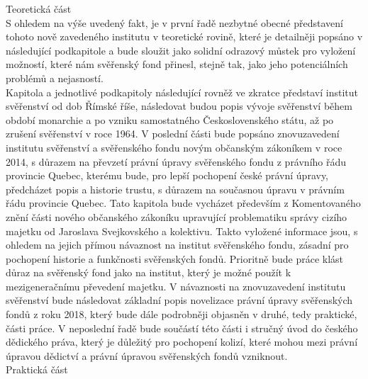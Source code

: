 \documentclass{article}
\begin{document}

\newpage

{\Large Teoretická část}\\

S ohledem na výše uvedený fakt, je v první řadě nezbytné obecné představení tohoto nově zavedeného institutu v teoretické rovině, které je detailněji popsáno v následující podkapitole a bude sloužit jako solidní odrazový můstek pro vylož\-ení možností, které nám svěřenský fond přinesl, stejně tak, jako jeho potenciálních problémů a nejasností. \\

Kapitola a jednotlivé podkapitoly následující rovněž ve zkratce představí institut svěřenství od dob Římské říše, následovat budou popis vývoje svěřenství během období monarchie a po vzniku samostatného Československého státu, až po zrušení svěřenství v roce 1964. V poslední části bude popsáno znovuzavedení institutu svěřenství a svěřenského fondu novým občanským zá\-koníkem v roce 2014, s důrazem na převzetí právní úpravy svěřenského fondu z právního řádu provincie Quebec, kterému bude, pro lepší pochopení české právní úpravy, předcházet popis a historie trustu, s důrazem na současnou úpravu v právním řádu provincie Quebec. Tato kapitola bude vycházet především z Komentovaného znění části nového občanského zákoníku upravující problematiku správy cizího majetku od Jaroslava Svejkovského a kolektivu. Takto vyložené informace jsou, s ohledem na jejich přímou návaznost na institut svěřenského fondu, zásadní pro pochopení historie a funkčnosti svěřenských fondů. Prioritně bude práce klást důraz na svěřenský fond jako na institut, který je možné použít k mezigeneračnímu převedení majetku. V návaznosti na znovuzavedení institutu svěřenství bude následovat základní popis novelizace právní úpravy svěřenských fondů z roku 2018, který bude dále podrobněji objasněn v druhé, tedy praktické, části práce. V neposlední řadě bude součástí této části i stručný úvod do českého dědického práva, který je důležitý pro pochopení kolizí, které mohou mezi právní úpravou dědictví a právní úpravou svěřenských fondů vzniknout.\\


{\Large Praktická část}\\
\end{document}
